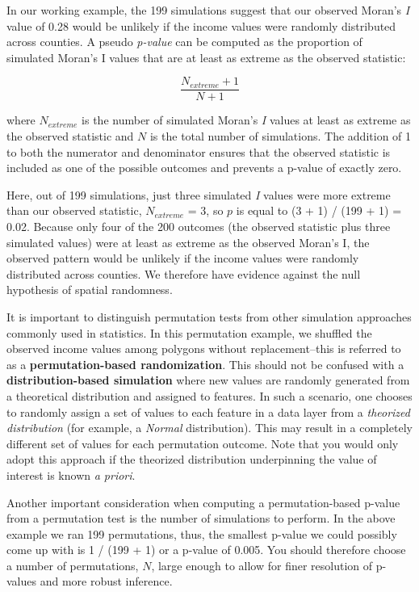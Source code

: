 \documentclass[
  letterpaper,
]{book}
\begin{document}
In our working example, the 199 simulations suggest that our observed
Moran's \emph{I} value of 0.28 would be unlikely if the income values
were randomly distributed across counties. A pseudo \emph{p-value} can
be computed as the proportion of simulated Moran's I values that are at
least as extreme as the observed statistic:

\[
\dfrac{N_{extreme}+1}{N+1}
\]

where \(N_{extreme}\) is the number of simulated Moran's \emph{I} values
at least as extreme as the observed statistic and \(N\) is the total
number of simulations. The addition of 1 to both the numerator and
denominator ensures that the observed statistic is included as one of
the possible outcomes and prevents a p-value of exactly zero.

Here, out of 199 simulations, just three simulated \emph{I} values were
more extreme than our observed statistic, \(N_{extreme}\) = 3, so \(p\)
is equal to (3 + 1) / (199 + 1) = 0.02. Because only four of the 200
outcomes (the observed statistic plus three simulated values) were at
least as extreme as the observed Moran's I, the observed pattern would
be unlikely if the income values were randomly distributed across
counties. We therefore have evidence against the null hypothesis of
spatial randomness.

It is important to distinguish permutation tests from other simulation
approaches commonly used in statistics. In this permutation example, we
shuffled the observed income values among polygons without
replacement--this is referred to as a \textbf{permutation-based
randomization}. This should not be confused with a
\textbf{distribution-based simulation} where new values are randomly
generated from a theoretical distribution and assigned to features. In
such a scenario, one chooses to randomly assign a set of values to each
feature in a data layer from a \emph{theorized distribution} (for
example, a \emph{Normal} distribution). This may result in a completely
different set of values for each permutation outcome. Note that you
would only adopt this approach if the theorized distribution
underpinning the value of interest is known \emph{a priori}.

Another important consideration when computing a permutation-based
p-value from a permutation test is the number of simulations to perform.
In the above example we ran 199 permutations, thus, the smallest p-value
we could possibly come up with is 1 / (199 + 1) or a p-value of 0.005.
You should therefore choose a number of permutations, \(N\), large
enough to allow for finer resolution of p-values and more robust
inference.
\end{document}
